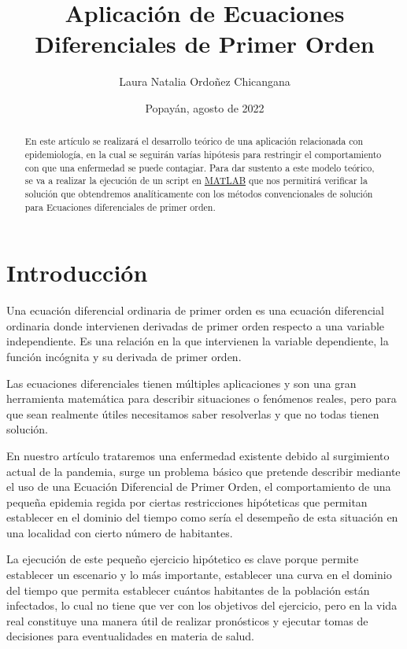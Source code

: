 \documentclass[12pt]{report}
\begin{document}
\title{Aplicación de Ecuaciones Diferenciales de Primer Orden}
\author{Laura Natalia Ordoñez Chicangana}
\date{Popayán, agosto de 2022}
\maketitle
\tableofcontents

\begin{abstract}
En este artículo se realizará el desarrollo teórico de una aplicación relacionada con epidemiología, en la cual se seguirán varías hipótesis para restringir el comportamiento con que una enfermedad se puede contagiar. Para dar sustento a este modelo teórico, se va a realizar la ejecución de un script en \href{https://www.mathworks.com/products/matlab.html}{MATLAB} que nos permitirá verificar la solución que obtendremos analíticamente con los métodos convencionales de solución para Ecuaciones diferenciales de primer orden.
\end{abstract}

\newpage

\section{Introducción}
Una ecuación diferencial ordinaria de primer orden es una ecuación diferencial ordinaria donde intervienen derivadas de primer orden respecto a una variable independiente. Es una relación en la que intervienen la variable dependiente, la función incógnita y su derivada de primer orden.

Las ecuaciones diferenciales tienen múltiples aplicaciones y son una gran herramienta matemática para describir situaciones o fenómenos reales, pero para que sean realmente útiles necesitamos saber resolverlas y que no todas tienen solución.

En nuestro artículo trataremos una enfermedad existente debido al surgimiento actual de la pandemia, surge un problema básico que pretende describir mediante el uso de una Ecuación Diferencial de Primer Orden, el comportamiento de una pequeña epidemia regida por ciertas restricciones hipóteticas que permitan establecer en el dominio del tiempo como sería el desempeño de esta situación en una localidad con cierto número de habitantes.

La ejecución de este pequeño ejercicio hipótetico es clave porque permite establecer un escenario y lo más importante, establecer una curva en el dominio del tiempo que permita establecer cuántos habitantes de la población están infectados, lo cual no tiene que ver con los objetivos del ejercicio, pero en la vida real constituye una manera útil de realizar pronósticos y ejecutar tomas de decisiones para eventualidades en materia de salud.
\end{document}
